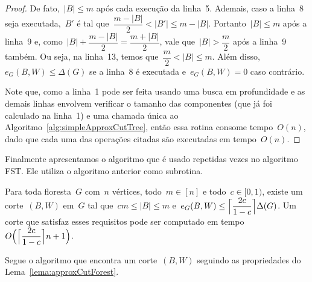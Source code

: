 	\begin{proof}
	De fato,~${|B|\le m}$ após cada execução da linha~5.
	Ademais, caso a linha~8 seja executada,~$B'$ é tal 
	que~${\dfrac{m-|B|}{2}< |B'|\le m-|B|}$.
	Portanto~$|B|\le m$ após a linha~9 e, 
	como~${|B| + \dfrac{m-|B|}{2} = \dfrac{m+|B|}{2}}$, vale 
	que~${|B|>\dfrac{m}{2}}$ após a linha~9 também.
	Ou seja, na linha~13, temos que~${\dfrac{m}{2} < |B| \le m}$.
	Além disso,~${e_G(B,W)\le \Delta(G)}$ se a linha~8 é
	executada e~${e_G(B,W)=0}$ caso contrário.

	Note que, como a linha~1 pode ser feita usando uma busca em 
	profundidade e as demais linhas envolvem verificar o tamanho 
	das componentes (que já foi calculado na linha~1) e uma 
	chamada única ao Algoritmo~\ref{alg:simpleApproxCutTree}, então 
	essa rotina consome tempo~$O(n)$, dado que cada uma 
	das operações citadas são executadas em tempo~$O(n)$. 
\end{proof}

\bigskip
\bigskip
\bigskip



Finalmente apresentamos o algoritmo que é usado repetidas 
vezes no algoritmo FST.
Ele utiliza o algoritmo anterior como subrotina.

\begin{lem}
\label{lema:approxCutForest}
	Para toda floresta~$G$ com~$n$ vértices, todo~${m \in [n]}$ e 
	todo~${c \in [0,1)}$, existe um corte~$(B,W)$ em~$G$ tal 
	que~${cm \le |B| \le m}$ 
	e~${e_G(B,W) \le \ceil[\Big]{ \dfrac{2c}{1-c}} \Delta(G)}$.
	Um corte que satisfaz esses requisitos pode ser computado em
	tempo~${O\Big(\ceil[\Big]{ \dfrac{2c}{1-c}} n+1\Big)}$.
\end{lem}


Segue o algoritmo que encontra um corte~$(B,W)$ seguindo
as propriedades do Lema~\ref{lema:approxCutForest}.

